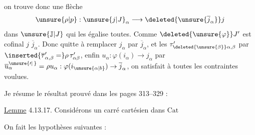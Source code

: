 
on trouve donc une flèche
\[
\unsure{\rho|p}:\unsure{j|J}_\alpha\longrightarrow\deleted{\unsure{\overline{j}_\alpha}}j
\]
dans $\unsure{\mathbb{J}|J}$ qui les égalise toutes. Comme $\deleted{\unsure{\varphi}}J'$ est cofinal  $j$   $\overline{j}_\alpha$. Donc quitte
à remplacer $j_\alpha$ par $\overline{j}_\alpha$, et  les $\tau'_{\deleted{\unsure{\beta}}\alpha,\beta}$ par $\inserted{\overline{\tau}'_{\alpha,\beta}=}\rho\,\tau'_{\alpha\beta}$, enfin $u_\alpha:\varphi(i_\alpha)\to j_\alpha$ par $\overline{u}^{\unsure{\prime|\,}}_\alpha=\rho u_\alpha:\varphi(i_{\unsure{\alpha|b}})\to\overline{j}_\alpha$, on satisfait à toutes les contraintes voulues.

Je résume le résultat  prouvé dans les pages 313--329 :

\llap{\rule[-1.0ex]{0.45pt}{3.1ex}\hspace{.7em}}\uline{Lemme} 4.13.17. Considérons un carré cartésien dans $\mathrm{Cat}$

On fait les  \llap{\rule[-1ex]{.45pt}{3ex}\hspace{.7em}}hypothèses suivantes :
